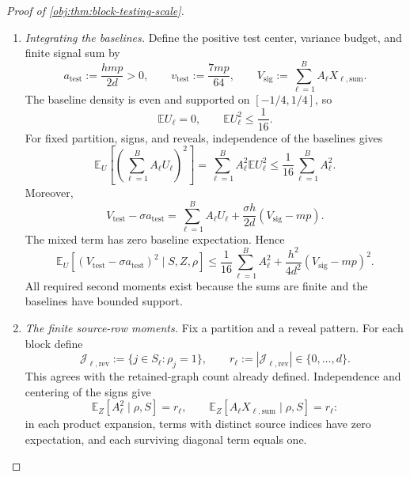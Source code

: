 \documentclass[11pt]{article}
\begin{document}
\begin{proof}[Proof of \cref{obj:thm:block-testing-scale}]
\begin{enumerate}
For a fixed true partition, the reveal indicator of each source depends on its \(d\) outgoing audit marks. These edge sets are disjoint across sources, so the reveal indicators have independent Bernoulli\((p)\) laws. They are independent of treatment signs and baselines. The statistic consequently has the law obtained by drawing the genuine partition, independent treatment signs, independent reveal indicators, and independent baselines, and then forming
\[
A_\ell=\sum_{j\in S_\ell}\rho_jX_j,
\qquad
V_{\mathrm{test}}
=
\sum_{\ell=1}^{B}
A_\ell\left(
U_\ell+\frac{\sigma h}{2d}X_{\ell,\mathrm{sum}}
\right).
\]
Mixing this identity over the partition and baselines gives the scalar law in the preceding projection inequality.

\item \textit{Integrating the baselines.}
Define the positive test center, variance budget, and finite signal sum by
\[
a_{\mathrm{test}}:=\frac{hmp}{2d}>0,
\qquad
v_{\mathrm{test}}:=\frac{7mp}{64},
\qquad
V_{\mathrm{sig}}:=\sum_{\ell=1}^{B}A_\ell X_{\ell,\mathrm{sum}}.
\]
The baseline density is even and supported on \([-1/4,1/4]\), so
\[
\mathbb E U_\ell=0,
\qquad
\mathbb E U_\ell^2\le\frac1{16}.
\]
For fixed partition, signs, and reveals, independence of the baselines gives
\[
\mathbb E_U\!\left[\left(\sum_{\ell=1}^{B}A_\ell U_\ell\right)^2\right]
=
\sum_{\ell=1}^{B}A_\ell^2\mathbb E U_\ell^2
\le\frac1{16}\sum_{\ell=1}^{B}A_\ell^2.
\]
Moreover,
\[
V_{\mathrm{test}}-\sigma a_{\mathrm{test}}
=
\sum_{\ell=1}^{B}A_\ell U_\ell
+\frac{\sigma h}{2d}(V_{\mathrm{sig}}-mp).
\]
The mixed term has zero baseline expectation. Hence
\[
\mathbb E_U[
(V_{\mathrm{test}}-\sigma a_{\mathrm{test}})^2
\mid S,Z,\rho]
\le
\frac1{16}\sum_{\ell=1}^{B}A_\ell^2
+\frac{h^2}{4d^2}(V_{\mathrm{sig}}-mp)^2.
\]
All required second moments exist because the sums are finite and the baselines have bounded support.

\item \textit{The finite source-row moments.}
Fix a partition and a reveal pattern. For each block define
\[
\mathcal J_{\ell,\mathrm{rev}}
:=\{j\in S_\ell:\rho_j=1\},
\qquad
r_\ell:=|\mathcal J_{\ell,\mathrm{rev}}|\in\{0,\ldots,d\}.
\]
This agrees with the retained-graph count already defined. Independence and centering of the signs give
\[
\mathbb E_Z[A_\ell^2\mid\rho,S]=r_\ell,
\qquad
\mathbb E_Z[A_\ell X_{\ell,\mathrm{sum}}\mid\rho,S]=r_\ell:
\]
in each product expansion, terms with distinct source indices have zero expectation, and each surviving diagonal term equals one.


\end{enumerate}
\end{proof}
\end{document}

